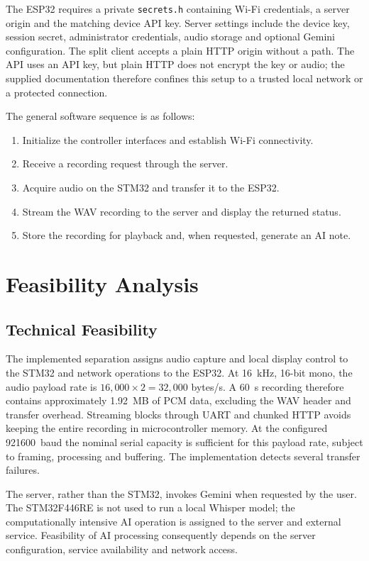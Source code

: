 The ESP32 requires a private \texttt{secrets.h} containing Wi-Fi credentials, a server origin and the matching device API key. Server settings include the device key, session secret, administrator credentials, audio storage and optional Gemini configuration. The split client accepts a plain HTTP origin without a path. The API uses an API key, but plain HTTP does not encrypt the key or audio; the supplied documentation therefore confines this setup to a trusted local network or a protected connection.

The general software sequence is as follows:
\begin{enumerate}
\item Initialize the controller interfaces and establish Wi-Fi connectivity.
\item Receive a recording request through the server.
\item Acquire audio on the STM32 and transfer it to the ESP32.
\item Stream the WAV recording to the server and display the returned status.
\item Store the recording for playback and, when requested, generate an AI note.
\end{enumerate}

\section{Feasibility Analysis}
\subsection{Technical Feasibility}
The implemented separation assigns audio capture and local display control to the STM32 and network operations to the ESP32. At 16~kHz, 16-bit mono, the audio payload rate is $16{,}000\times 2=32{,}000$ bytes/s. A 60~s recording therefore contains approximately 1.92~MB of PCM data, excluding the WAV header and transfer overhead. Streaming blocks through UART and chunked HTTP avoids keeping the entire recording in microcontroller memory. At the configured 921600~baud the nominal serial capacity is sufficient for this payload rate, subject to framing, processing and buffering. The implementation detects several transfer failures.

The server, rather than the STM32, invokes Gemini when requested by the user. The STM32F446RE is not used to run a local Whisper model; the computationally intensive AI operation is assigned to the server and external service. Feasibility of AI processing consequently depends on the server configuration, service availability and network access.

